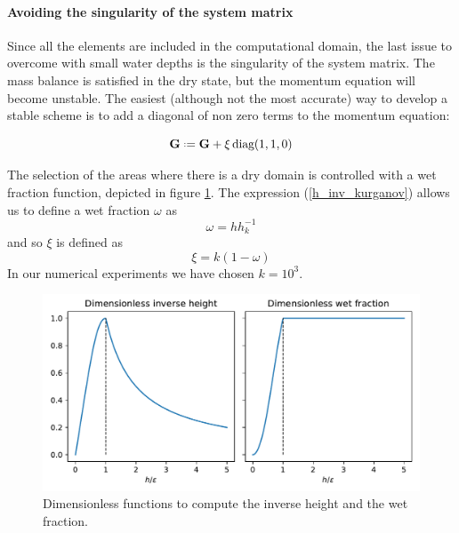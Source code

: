\documentclass[a4paper,12pt]{article}
\newcommand\Ignasi[1]{\ifthenelse{\boolean{show_comments}}{\textcolor{blue}{#1}}{}}
\newcommand\IgnasiCorregit[1]{\ifthenelse{\boolean{show_corregit}}{\textcolor{blue}{#1}}{}}
\newcommand{\defeq}{\mathrel{\vcenter{\baselineskip0.5ex\lineskiplimit0pt\hbox{\scriptsize.}\hbox{\scriptsize.}}}=}
\begin{document}
\paragraph{Avoiding the singularity of the system matrix}
Since all the elements are included in the computational domain, the last issue to overcome with small water depths is the singularity of the system matrix. The mass balance is satisfied in the dry state, but the momentum equation will become unstable. The easiest (although not the most accurate) way to develop a stable scheme is to add a diagonal of non zero terms to the momentum equation:

\begin{equation}
\mathbf{G} \defeq \mathbf{G} + \xi\,\text{diag}(1, 1, 0)
\end{equation}

The selection of the areas where there is a dry domain is controlled with a wet fraction function, depicted in figure \ref{inverse_heihgt}. The expression (\ref{h_inv_kurganov}) allows us to define a wet fraction $\omega$ as
\begin{equation}
\omega = hh^{-1}_k
\end{equation}
and so $\xi$ is defined as \IgnasiCorregit{CREC QUE EL SIMBOL $\alpha$ JA L'HAVIES UTILITZAT ABANS}
\begin{equation}
\xi = k(1-\omega)
\end{equation}
In our numerical experiments we have chosen $k=10^3$.

\begin{figure}
    \centering
    \includegraphics[width=\textwidth]{img/fig/inverse_height.pdf}
    \caption{Dimensionless functions to compute the  inverse height and the wet fraction.}
    \label{inverse_heihgt}
\end{figure}
\end{document}
